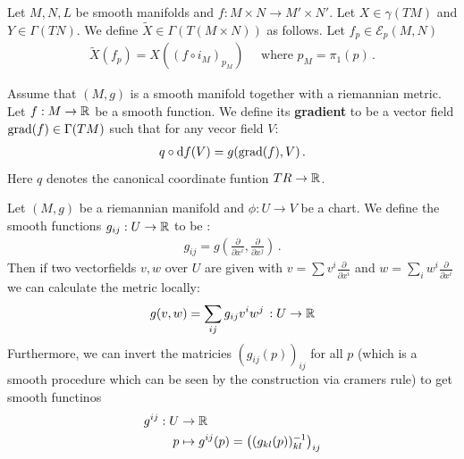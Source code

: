 	\begin{definition}
		Let $M,N,L$ be smooth manifolds and $f:M\times N \to M'\times N'$. Let $X\in \gamma(TM)$ and $Y\in \Gamma(TN)$. We define $\tilde{X}\in \Gamma(T(M\times N))$ as follows. Let $f_p\in \mathcal{E}_p(M,N)$
		\begin{align*}
			\tilde{X}(f_p)=X((f\circ i_M)_{p_M}) \quad \text{ where }p_M=\pi_1(p) \, .
		\end{align*}
	\end{definition}
\begin{definition}
Assume that $(M,g)$ is a smooth manifold together with a riemannian metric. Let $f:M\to \mathbb{R}$ be a smooth function. We define its \textbf{gradient} to be a vector field $\mathrm{grad}(f)\in \Gamma(TM)$ such that for any vecor field $V$:
\begin{align*}
q\circ \mathop{}\!\mathrm{d} f (V) = g(\mathrm{grad}(f),V) \, .
\end{align*} Here $q$ denotes the canonical coordinate funtion $TR\to \mathbb{R}$.
\end{definition}
\begin{definition}
	Let $(M,g)$ be a riemannian manifold and $\phi:U\to V$ be a chart. We define the smooth functions $g_{ij}:U\to \mathbb{R}$ to be :
	\begin{align*}
		g_{ij}=g(\frac{\partial}{\partial x^i},\frac{\partial}{\partial x^j}) \, .
	\end{align*}
	Then if two vectorfields $v,w$ over $U$ are given with $v=\sum v^i \frac{\partial}{\partial x^i}$ and $w=\sum _i w^i \frac{\partial}{\partial x^i}$ we can calculate the metric locally:
	\begin{align*}
		g(v,w)=\sum_{ij}g_{ij} v^iw^j\, :U\to \mathbb{R}
	\end{align*} Furthermore, we can invert the matricies $(g_{ij}(p))_{ij}$ for all $p$ (which is a smooth procedure which can be seen by the construction via cramers rule) to get smooth functinos 
\begin{align*}
	g^{ij}: U&\to \mathbb{R}\\
p&\mapsto g^{ij}(p)= \left( (g_{kl}(p))_{kl}^{-1} \right)_{ij}
\end{align*}
\end{definition}


